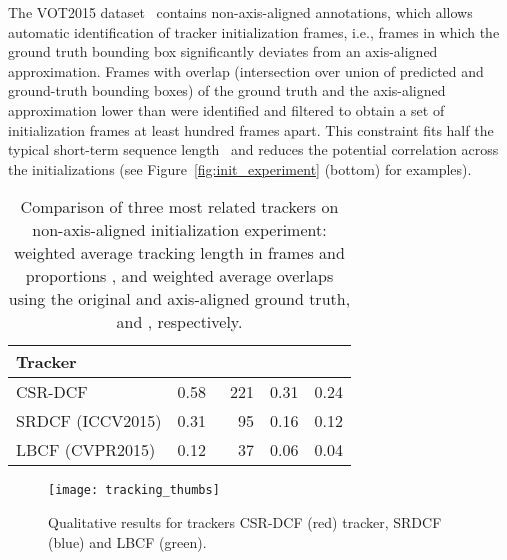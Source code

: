 \documentclass[twocolumn]{article}
\newcommand*\circledd[1]{\tikz[baseline=(char.base)]{
            \node[shape=circle,draw,inner sep=0.15pt] (char) {#1};}}
\newcommand{\first}[1]{{\raisebox{0.8pt}{\footnotesize \color{gold} \circledd{1}}\hspace{3.5pt}#1}}
\newcommand{\second}[1]{{\raisebox{0.8pt}{\footnotesize \color{silver} \circledd{2}}\hspace{3.5pt}#1}}
\newcommand{\third}[1]{{\raisebox{0.8pt}{\footnotesize \color{bronze} \circledd{3}}\hspace{3.5pt}#1}}
\newcommand{\first}[1]{\bf{\color{red}#1}}
\newcommand{\second}[1]{\em{\color{blue}#1}}
\newcommand{\third}[1]{{\color{green}#1}}
\begin{document}
The VOT2015 dataset~\citep{kristan_vot2015} contains non-axis-aligned annotations, which allows automatic identification of tracker initialization frames, i.e., frames in which the ground truth bounding box significantly deviates from an axis-aligned approximation. Frames with overlap (intersection over union of predicted and ground-truth bounding boxes) of the ground truth and the axis-aligned approximation lower than  were identified and filtered to obtain a set of initialization frames at least hundred frames apart. This constraint fits half the typical short-term sequence length~\citep{kristan_vot2015} and reduces the potential correlation across the initializations (see Figure~\ref{fig:init_experiment} (bottom) for examples).

\begin{table}[!t]
\begin{center}
\caption{Comparison of three most related trackers on non-axis-aligned initialization experiment: weighted average tracking length in frames  and proportions , and weighted average overlaps using the original and axis-aligned ground truth,  and , respectively.}
\label{tab:initi_experiment}
\begin{tabular}{l r r r r}
\hline
Tracker & \multicolumn{1}{c}{} & \multicolumn{1}{c}{} & \multicolumn{1}{c}{} & \multicolumn{1}{c}{} \\
\hline
CSR-DCF & \first{0.58} & \first{221} & \first{0.31} & \first{0.24} \\
SRDCF \tiny{(ICCV2015)} & \second{0.31} & \second{~~95} & \second{0.16} & \second{0.12} \\
LBCF \tiny{(CVPR2015)}& \third{0.12} & \third{~~37} & \third{0.06} & \third{0.04} \\
\hline
\end{tabular}
\end{center}
\end{table}

\begin{figure}[th]
\centering
\texttt{[image: tracking\_thumbs]}
\caption{Qualitative results for trackers CSR-DCF (red) tracker, SRDCF (blue) and LBCF (green).}
\label{fig:thumbs}
\end{figure}
\end{document}
